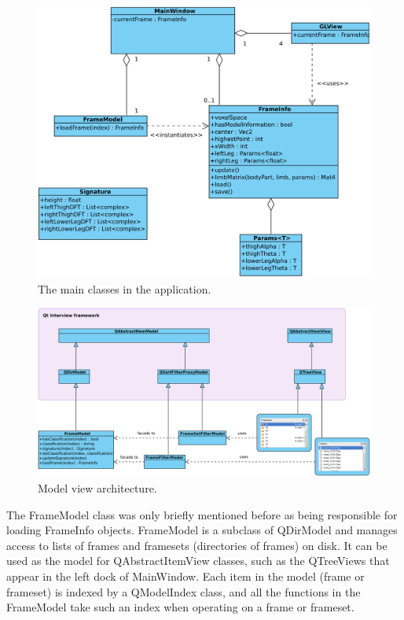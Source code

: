 \begin{landscape}
	\begin{figure}[p]
		\centering
		\includegraphics[width=\textwidth]{uml/mainwindow.png}
		\caption{The main classes in the application.}
		\label{MainClasses}
	\end{figure}
	
	\begin{figure}[p]
		\centering
		\includegraphics[width=20cm]{uml/interview.png}
		\caption{Model view architecture.}
		\label{ModelView}
	\end{figure}
\end{landscape}

The FrameModel class was only briefly mentioned before as being responsible for loading FrameInfo objects.
FrameModel is a subclass of QDirModel and manages access to lists of frames and framesets (directories of frames) on disk.
It can be used as the model for QAbstractItemView classes, such as the QTreeViews that appear in the left dock of MainWindow.
Each item in the model (frame or frameset) is indexed by a QModelIndex class, and all the functions in the FrameModel take such an index when operating on a frame or frameset.

